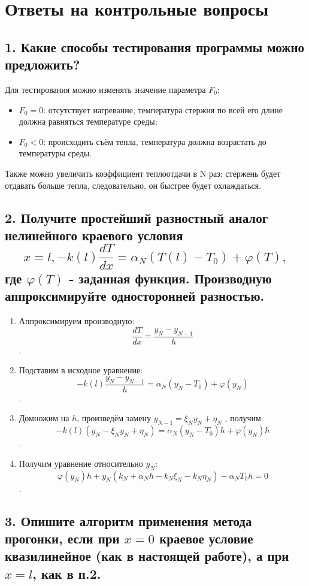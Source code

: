 



\section*{Ответы на контрольные вопросы}


\subsection*{1. Какие способы тестирования программы можно предложить?}

Для тестирования можно изменять значение параметра $F_0$:
\begin{itemize}
	\item $F_0 = 0$: отсутствует нагревание, температура стержня по всей его длине должна равняться температуре среды;
	\item $F_0 < 0$: происходить съём тепла, температура должна возрастать до температуры среды.
\end{itemize}

Также можно увеличить коэффициент теплоотдачи в N раз: стержень будет отдавать больше тепла, следовательно, он быстрее будет охлаждаться.


\subsection*{2. Получите простейший разностный аналог нелинейного краевого условия 
$$ x = l, -k(l)\frac{dT}{dx}=\alpha_N(T(l)- T_0) + \varphi(T), $$ где $\varphi(T)$ - заданная функция. Производную аппроксимируйте односторонней разностью.}

\begin{enumerate}
	\item Аппроксимируем производную: $$\frac{dT}{dx} = \frac{y_N - y_{N-1}}{h}$$.
	\item Подставим в исходное уравнение: $$-k(l)\frac{y_N - y_{N-1}}{h}=\alpha_N(y_N - T_0) + \varphi(y_N)$$.
	\item Домножим на $h$, произведём замену $y_{N - 1} = \xi_{N} y_{N} + \eta_{N}$ , получим: 
	$$-k(l)(y_N - \xi_N y_N + \eta_N)=\alpha_N(y_N - T_0)h + \varphi(y_N)h$$.
	\item Получим уравнение относительно $y_N$: $$\varphi(y_N)h + y_N(k_N + \alpha_Nh - k_N \xi_N - k_N \eta_N) - \alpha_NT_0h = 0$$.
\end{enumerate}

\subsection*{3. Опишите алгоритм применения метода прогонки, если при $x = 0$ краевое условие квазилинейное (как в настоящей работе), а при $x = l$, как в п.2.}

